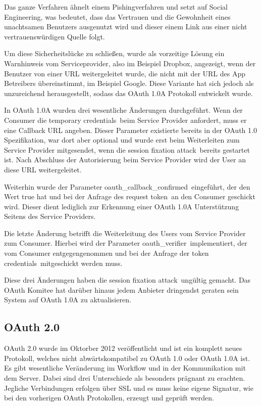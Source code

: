 Das ganze Verfahren ähnelt einem Pishingverfahren und setzt auf Social Engineering, was bedeutet, dass das Vertrauen und die Gewohnheit eines unachtsamen Benutzers ausgenutzt wird und dieser einem Link aus einer nicht vertrauenswürdigen Quelle folgt.

Um diese Sicherheitslücke zu schließen, wurde als vorzeitige Lösung ein Warnhinweis vom Serviceprovider, also im Beispiel Dropbox, angezeigt, wenn der Benutzer von einer \ac{URL} weitergeleitet wurde, die nicht mit der \ac{URL} des \ac{App} Betreibers übereinstimmt, im Beispiel Google\cite[vgl.][]{session-fixation-attack}.
Diese Variante hat sich jedoch als unzureichend herausgestellt, sodass das OAuth 1.0A Protokoll entwickelt wurde.

In OAuth 1.0A wurden drei wesentliche Änderungen durchgeführt.
Wenn der Consumer die \frqq temporary credentials\flqq\ beim Service Provider anfordert, muss er eine Callback URL angeben\cite[vgl.][]{oauth10a}.
Dieser Parameter existierte bereits in der OAuth 1.0 Spezifikation, war dort aber optional und wurde erst beim Weiterleiten zum Service Provider mitgesendet, wenn die \frqq session fixation attack\flqq\ bereits gestartet ist.
Nach Abschluss der Autorisierung beim Service Provider wird der User an diese URL weitergeleitet.

Weiterhin wurde der Parameter \frqq oauth\_callback\_confirmed\flqq\ eingeführt, der den Wert true hat und bei der Anfrage des \frqq request token\flqq\ an den Consumer geschickt wird\cite[vgl.][]{oauth10a}.
Dieser dient lediglich zur Erkennung einer OAuth 1.0A Unterstützung Seitens des Service Providers.

Die letzte Änderung betrifft die Weiterleitung des Users vom Service Provider zum Consumer.
Hierbei wird der Parameter \frqq oauth\_verifier\flqq\ implementiert, der vom Consumer entgegengenommen und bei der Anfrage der \frqq token credentials\flqq\ mitgeschickt werden muss\cite[vgl.][]{oauth10a}.

Diese drei Änderungen haben die \frqq session fixation attack\flqq\ ungültig gemacht.
Das OAuth Komitee hat darüber hinaus jedem Anbieter dringendst geraten sein System auf OAuth 1.0A zu aktualisieren\cite[vgl.][]{session-fixation-attack}.

\subsection{OAuth 2.0}
\label{authentifizierung-oauth-2}
OAuth 2.0 wurde im Oktorber 2012 veröffentlicht und ist ein komplett neues Protokoll, welches nicht abwärtskompatibel zu OAuth 1.0 oder OAuth 1.0A ist\cite[vgl.][]{eran10}.
Es gibt wesentliche Veränderung im Workflow und in der Kommunikation mit dem Server.
Dabei sind drei Unterschiede als besonders prägnant zu erachten.
Jegliche Verbindungen erfolgen über \ac{SSL} und es muss keine eigene Signatur, wie bei den vorherigen OAuth Protokollen, erzeugt und geprüft werden\cite[vgl.][]{oauth12}.

